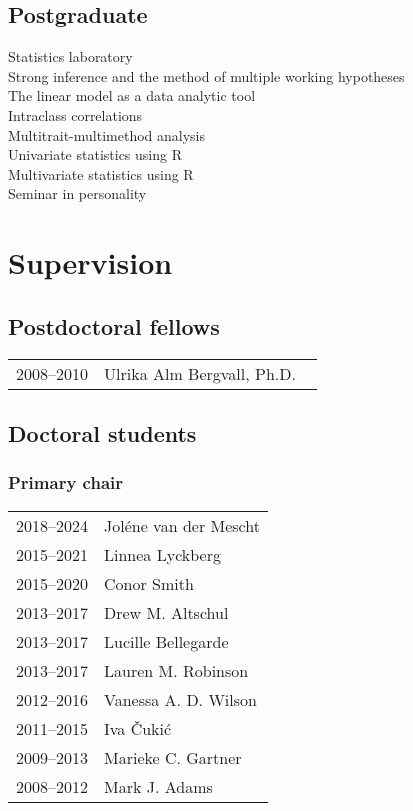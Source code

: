 \documentclass[11pt]{article}
\begin{document}
\subsection*{Postgraduate}
Statistics laboratory \\
Strong inference and the method of multiple working hypotheses \\
The linear model as a data analytic tool \\
Intraclass correlations \\
Multitrait-multimethod analysis \\
Univariate statistics using R \\
Multivariate statistics using R \\
Seminar in personality

\section*{Supervision}
\subsection*{Postdoctoral fellows}

\begin{tabular}{p{3cm}p{12cm}}
2008--2010 & Ulrika Alm Bergvall, Ph.D. \
\end{tabular}

\subsection*{Doctoral students}

\subsubsection*{Primary chair}
\begin{tabular}{p{3cm}p{12cm}}
2018--2024 & Joléne van der Mescht \\
2015--2021 & Linnea Lyckberg \\
2015--2020 & Conor Smith \\
2013--2017 & Drew M. Altschul \\
2013--2017 & Lucille Bellegarde \\
2013--2017 & Lauren M. Robinson \\
2012--2016 & Vanessa A. D. Wilson \\
2011--2015 & Iva Čukić \\
2009--2013 & Marieke C. Gartner \\
2008--2012 & Mark J. Adams
\end{tabular}
\end{document}
